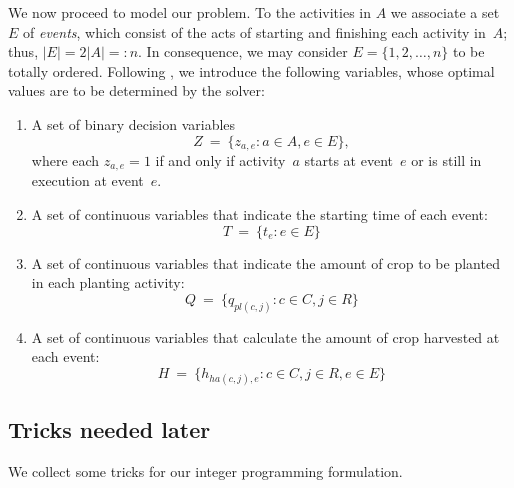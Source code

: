 \documentclass[11pt,reqno]{amsart}
\numberwithin{equation}{section}
\begin{document}
We now proceed to model our problem.  To the activities in $A$ we associate a set~$E$ of
\emph{events}, which consist of the acts of starting and finishing each activity in~$A$;
thus, $|E|=2|A|=:n$. In consequence, we may consider $E=\{1,2,\dots, n\}$ to be
totally ordered.  Following \cite{artigues-etal11}, we introduce the following variables,
whose optimal values are to be determined by the solver:

\begin{enumerate}
\item A set of binary decision variables 
  \[
     Z
     \ = \
     \big\{z_{a,e}: a\in A, e\in E\big\},
  \]
  where each $z_{a,e}=1$ if and only if activity~$a$ starts at
  event~$e$ or is still in execution at event~$e$.

\smallskip
\item A set of continuous variables that indicate the starting time of each event:
  \[
     T
     \ = \
     \big\{t_e : e\in E\big\}
  \]

\smallskip
\item A set of continuous variables that indicate the amount of crop to be planted in each
  planting activity:
  \[
     Q
     \ = \
     \big\{q_{pl(c,j)} : c\in C, j\in R\big\}
  \]

\smallskip
\item A set of continuous variables that calculate the amount of crop harvested at each event:
  \[
     H
     \ = \
     \big\{h_{ha(c,j),e} : c\in C, j\in R, e\in E\big\}
  \]

\end{enumerate}

\subsection{Tricks needed later}

We collect some tricks for our integer programming formulation.
\end{document}

